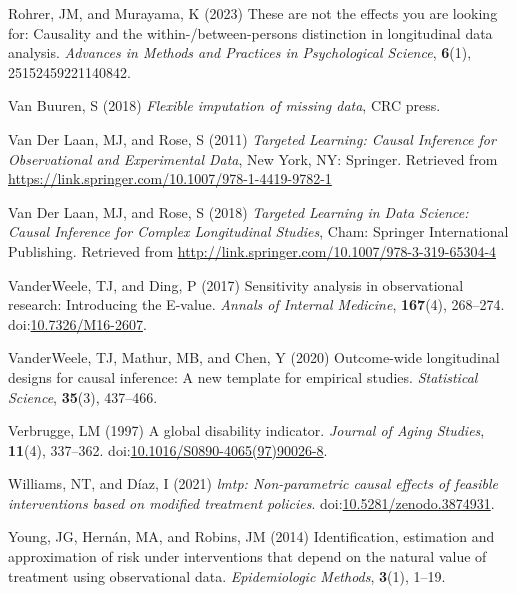 \documentclass[
  single column]{article}
\newlength{\cslhangindent}
\newenvironment{CSLReferences}[2] %
 {\begin{list}{}{%
  \setlength{\itemindent}{0pt}
  \setlength{\leftmargin}{0pt}
  \setlength{\parsep}{0pt}
  \ifodd #1
   \setlength{\leftmargin}{\cslhangindent}
   \setlength{\itemindent}{-1\cslhangindent}
  \fi
  \setlength{\itemsep}{#2\baselineskip}}}
 {\end{list}}
\begin{document}
\begin{CSLReferences}{1}{0}
Rohrer, JM, and Murayama, K (2023) These are not the effects you are
looking for: Causality and the within-/between-persons distinction in
longitudinal data analysis. \emph{Advances in Methods and Practices in
Psychological Science}, \textbf{6}(1), 25152459221140842.

Van Buuren, S (2018) \emph{Flexible imputation of missing data}, CRC
press.

Van Der Laan, MJ, and Rose, S (2011) \emph{Targeted Learning: Causal
Inference for Observational and Experimental Data}, New York, NY:
Springer. Retrieved from
\url{https://link.springer.com/10.1007/978-1-4419-9782-1}

Van Der Laan, MJ, and Rose, S (2018) \emph{Targeted Learning in Data
Science: Causal Inference for Complex Longitudinal Studies}, Cham:
Springer International Publishing. Retrieved from
\url{http://link.springer.com/10.1007/978-3-319-65304-4}

VanderWeele, TJ, and Ding, P (2017) Sensitivity analysis in
observational research: Introducing the {E}-value. \emph{Annals of
Internal Medicine}, \textbf{167}(4), 268--274.
doi:\href{https://doi.org/10.7326/M16-2607}{10.7326/M16-2607}.

VanderWeele, TJ, Mathur, MB, and Chen, Y (2020) Outcome-wide
longitudinal designs for causal inference: A new template for empirical
studies. \emph{Statistical Science}, \textbf{35}(3), 437--466.

Verbrugge, LM (1997) A global disability indicator. \emph{Journal of
Aging Studies}, \textbf{11}(4), 337--362.
doi:\href{https://doi.org/10.1016/S0890-4065(97)90026-8}{10.1016/S0890-4065(97)90026-8}.

Williams, NT, and Díaz, I (2021) \emph{{l}mtp: Non-parametric causal
effects of feasible interventions based on modified treatment policies}.
doi:\href{https://doi.org/10.5281/zenodo.3874931}{10.5281/zenodo.3874931}.

Young, JG, Hernán, MA, and Robins, JM (2014) Identification, estimation
and approximation of risk under interventions that depend on the natural
value of treatment using observational data. \emph{Epidemiologic
Methods}, \textbf{3}(1), 1--19.

\end{CSLReferences}
\end{document}
